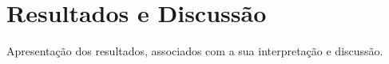 \section{Resultados e Discussão}

Apresentação dos resultados, associados com a sua interpretação e discussão.
